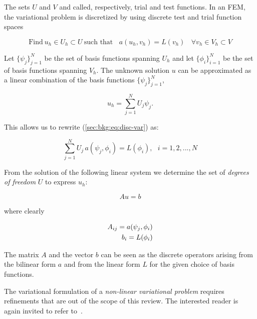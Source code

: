 The sets $U$ and $V$ and called, respectively, trial and test functions. In an FEM, the variational problem is discretized by using discrete test and trial function spaces

\begin{equation}
\label{sec:bkg:eq:disc-var}
\text{Find}\ u_h \in U_h \subset U\ \text{such that}\ \ \ \ a(u_h, v_h) = L(v_h)\ \ \ \ \forall v_h \in V_h \subset V
\end{equation}

Let $\lbrace \psi_j \rbrace_{j=1}^N$ be the set of basis functions spanning $U_h$ and let $\lbrace \phi_i \rbrace_{i=1}^{N}$ be the set of basis functions spanning $V_h$. The unknown solution $u$ can be approximated as a linear combination of the basis functions $\lbrace \psi_j \rbrace_{j=1}^N$,

\begin{equation}
u_h = \sum_{j=1}^N U_j \psi_j.
\end{equation}

This allows us to rewrite (\ref{sec:bkg:eq:disc-var}) as:

\begin{equation}
\sum_{j=1}^N U_j \, a(\psi_j, \phi_i) = L(\phi_i),\ \ \ i=1,2,...,N
\end{equation}

From the solution of the following linear system we determine the set of {\em degrees of freedom} $U$ to express $u_h$:

\begin{equation}
\label{sec:bkg:eq:lin-sys}
Au = b
\end{equation}

where clearly

\begin{equation}
\label{sec:bkg:eq:disc-op}
\centering
\begin{split}
A_{ij} = a(\psi_j,\phi_i) \\
b_i = L(\phi_i)
\end{split}
\end{equation}

The matrix $A$ and the vector $b$ can be seen as the discrete operators arising from the bilinear form $a$ and from the linear form $L$ for the given choice of basis functions.

The variational formulation of a {\em non-linear variational problem} requires refinements that are out of the scope of this review. The interested reader is again invited to refer to~\cite{brenner-and-scott}.

